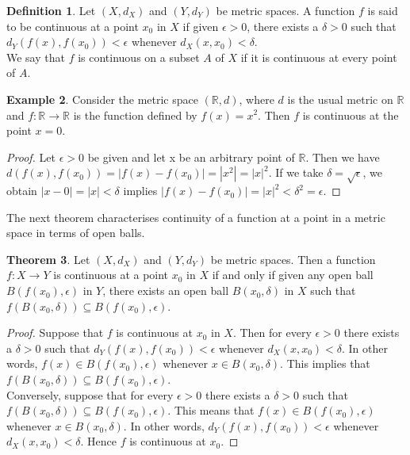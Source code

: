 \documentclass[11pt,a4paper]{article}
\theoremstyle{definition}
\newtheorem{thm}{Theorem}[subsection]
\newtheorem{defn}[thm]{Definition}
\newtheorem{exa}[thm]{Example}
\begin{document}
 
\begin{defn}
 Let $(X,d_X)$ and $(Y,d_Y)$ be metric spaces. A function $f$ is said to be continuous at a point $x_0$ in $X$ if given $\epsilon >0$, there exists a $\delta >0$ such that $d_Y(f(x),f(x_0))<\epsilon$ whenever $d_X(x,x_0)<\delta$.\\ We say that $f$ is continuous on a subset $A$ of $X$ if it is continuous at every point of $A$.
\end{defn}


 
\begin{exa}
Consider the metric space $(\mathbb{R},d)$, where $d$ is the usual metric on $\mathbb{R}$ and $f:\mathbb{R} \rightarrow \mathbb{R}$ is the function defined by $f(x)=x^2$. Then $f$ is continuous at the point $x=0$.
\end{exa}



\begin{proof}
Let $\epsilon >0$ be given and let x be an arbitrary point of $\mathbb{R}$. Then we have $d(f(x),f(x_0))=|f(x)-f(x_0)|=|x^2|=|x|^2$. If we take $\delta =\sqrt{\epsilon}$, we obtain $|x-0|=|x|<\delta$ implies $|f(x)-f(x_0)|=|x|^2<\delta^2 =\epsilon$.
\end{proof}

The next theorem characterises continuity of a function at a point in a metric space in terms of open balls.




\begin{thm}
Let $(X,d_X)$ and $(Y,d_Y)$ be metric spaces. Then a function $f:X\rightarrow Y$ is continuous at a point $x_0$ in $X$ if and only if given any open ball $B(f(x_0),\epsilon)$ in $Y$, there exists an open ball $B(x_0,\delta)$ in $X$ such that  $f(B(x_0,\delta))\subseteq B(f(x_0),\epsilon)$.
\end{thm}


\begin{proof}
Suppose that $f$ is continuous at $x_0$ in $X$. Then for every $\epsilon >0$ there exists a $\delta >0$ such that $d_Y(f(x),f(x_0))<\epsilon$ whenever $d_X(x,x_0)<\delta$. In other words, $f(x)\in B(f(x_0),\epsilon)$ whenever $x\in B(x_0,\delta)$. This implies that $f(B(x_0,\delta))\subseteq B(f(x_0),\epsilon)$.\\ 
Conversely, suppose that for every $\epsilon >0$ there exists a $\delta >0$ such that $f(B(x_0,\delta))\subseteq B(f(x_0),\epsilon)$. This means that $f(x)\in B(f(x_0),\epsilon)$ whenever $x\in B(x_0,\delta)$. In other words, $d_Y(f(x),f(x_0))<\epsilon$ whenever $d_X(x,x_0)<\delta$. Hence $f$ is continuous at $x_0$.
\end{proof}
\end{document}
